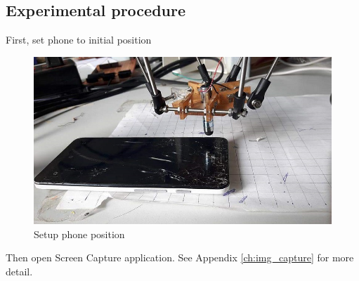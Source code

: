 \subsection{Experimental procedure}
First, set phone to initial position

	\begin{figure}[H]
		\centering
		\includegraphics[scale=0.5]{Chapters/Fig/phone_setup.jpg}
		\caption{Setup phone position}
		\label{fig:phone_setup}
	\end{figure}

Then open Screen Capture application. See Appendix \ref{ch:img_capture} for more detail.

